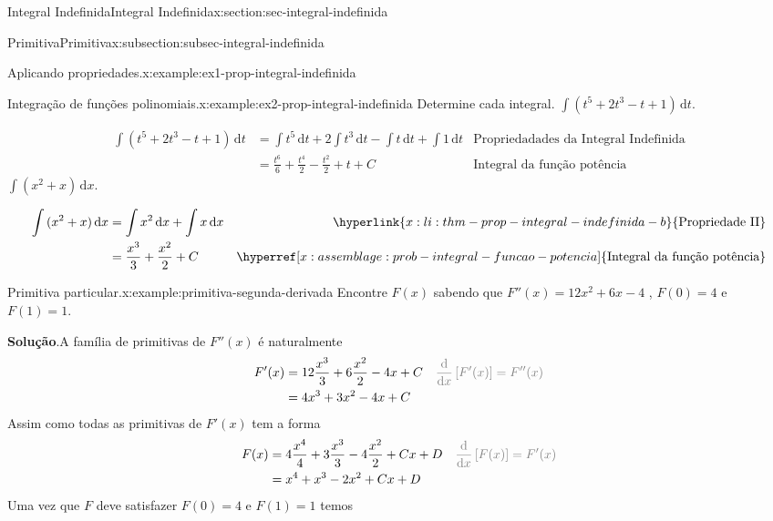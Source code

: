 \documentclass[oneside,10pt,]{article}
\newcommand{\blocktitlefont}{\relax}
\numberwithin{equation}{section}
\newcommand{\dd}{\mathrm{d}}
\newcommand{\integral}[2]{\displaystyle\int {#1}\,\dd {#2}}
\newcommand{\amp}{&}
\begin{document}
\begin{sectionptx}{Integral Indefinida}{}{Integral Indefinida}{}{}{x:section:sec-integral-indefinida}
\begin{subsectionptx}{Primitiva}{}{Primitiva}{}{}{x:subsection:subsec-integral-indefinida}
\begin{example}{Aplicando propriedades.}{x:example:ex1-prop-integral-indefinida}
%
%
\end{example}
\begin{example}{Integração de funções polinomiais.}{x:example:ex2-prop-integral-indefinida}%
Determine cada integral. \(\integral{(t^5 + 2t^3 - t + 1)}{t}\).%
 \par\smallskip%
\noindent%
\begin{align*}
\integral{(t^5 + 2t^3 - t + 1)}{t}\amp =
\integral{t^5}{t} + 2\integral{t^3}{t} - \integral{t}{t} +
\integral{1}{t}
\amp \hyperref[x:assemblage:thm-prop-integral-indefinida]{\text{Propriedadades da Integral Indefinida}}\\
\amp = \frac{t^{6}}{6}  + \frac{t^{4}}{2} - \frac{t^{2} }{2}  + t + C \amp \hyperref[x:assemblage:prob-integral-funcao-potencia]{\text{Integral da função potência}}
\end{align*}
%
 \(\integral{(x^2+x)}{x}\).%
\par\smallskip%
\noindent%
\begin{align*}
\integral{(x^2+x)}{x}\amp = \integral{x^2}{x} + \integral{x}{x} \amp \hyperlink{x:li:thm-prop-integral-indefinida-b}{\text{Propriedade II}}\\
\amp = \frac{x^3}{3} + \frac{x^2}{2} + C \amp \hyperref[x:assemblage:prob-integral-funcao-potencia]{\text{Integral da função potência}}
\end{align*}
%
%
\end{example}
\begin{example}{Primitiva particular.}{x:example:primitiva-segunda-derivada}%
Encontre \(F(x)\) sabendo que \(F''(x)=12x^2+6x-4\) , \(F(0)=4\) e \(F(1)=1\).%
\par\smallskip%
\noindent\textbf{\blocktitlefont Solução}.\hypertarget{g:solution:idp24}{}\quad{}A família de primitivas de \(F''(x)\) é naturalmente%
\begin{align*}
F'(x) \amp = 12\frac{x^3}{3} + 6\frac{x^2}{2} -4x+ C \amp  \color{gray}{\frac{\dd}{\dd x}\left[F'(x)\right]=F''(x)} \\
\amp =4x^3 + 3x^2-4x+C 
\end{align*}
Assim como todas as primitivas de \(F'(x)\) tem a forma%
\begin{align*}
F(x)\amp = 4\frac{x^4}{4} + 3\frac{x^3}{3} -4\frac{x^2}{2} + Cx + D \amp \color{gray}{\frac{\dd}{\dd x}\left[F(x)\right]=F'(x)} \\
\amp = x^4 + x^3-2x^2+Cx+D 
\end{align*}
Uma vez que \(F\) deve satisfazer \(F(0)=4\) e \(F(1)=1\) temos%
\begin{align*}

\end{align*}
\end{example}
\end{subsectionptx}
\end{sectionptx}
\end{document}
